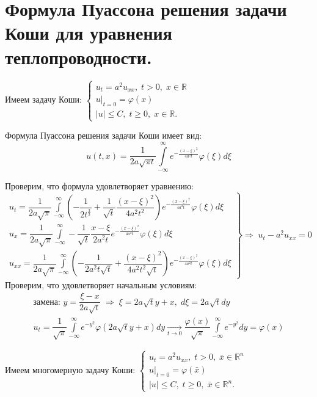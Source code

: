 \chapter{Формула Пуассона решения задачи Коши для уравнения теплопроводности.}
\label{cha:12}

$\text{Имеем задачу Коши: }\begin{cases}
	u_{t} = a^2 u_{xx}, \; t > 0, \; x \in \mathbb{R}\\
	u|_{t = 0} = \varphi (x) \\
	|u| \leq C, \; t \geq 0, \; x \in \mathbb{R}.
\end{cases}$

\begin{theorem}\label{lec:12/the:1}
	Формула Пуассона решения задачи Коши имеет вид:
	$$u(t, x) = \dfrac{1}{2a\sqrt{\pi t}}\int\limits_{-\infty}^{\infty}e^{-\frac{(x - \xi)^2}{4a^2 t}}\varphi (\xi) d\xi$$
\end{theorem}
\begin{Proof}
Проверим, что формула удовлетворяет уравнению:
$$\left.
  		\begin{array}{ccc}
    		u_t = \dfrac{1}{2a\sqrt{\pi}} \int\limits_{-\infty}^{\infty}(-\dfrac{1}{2t^{\frac{3}{2}}} + \dfrac{1}{\sqrt{t}}\dfrac{(x - \xi)^2}{4a^2t^2})e^{-\frac{(x - \xi)^2}{4a^2t}}\varphi(\xi)d\xi \\
			u_x = \dfrac{1}{2a\sqrt{\pi}} \int\limits_{-\infty}^{\infty} -\dfrac{1}{\sqrt{t}}\dfrac{x - \xi}{2a^2t}e^{-\frac{(x - \xi)^2}{4a^2t}}\varphi(\xi)d\xi \\
			u_{xx} = \dfrac{1}{2a\sqrt{\pi}}\int\limits_{-\infty}^{\infty} (-\dfrac{1}{2a^2t\sqrt{t}} + \dfrac{(x - \xi)^2}{4a^2t^2\sqrt{t}})e^{-\frac{(x - \xi)^2}{4a^2t}}\varphi(\xi)d\xi
  		\end{array}
	\right\} \Rightarrow \;  u_{t} - a^2 u_{xx} = 0$$
Проверим, что удовлетворяет начальным условиям: 
$$\begin{gathered}
	\text{замена: }y = \dfrac{\xi - x}{2a\sqrt{t}} \; \Rightarrow \; \xi = 2a\sqrt{t}y + x, \; d\xi = 2a\sqrt{t}dy \\
	u_t = \dfrac{1}{\sqrt{\pi}} \int\limits_{-\infty}^{\infty} e^{-y^2}\varphi(2a\sqrt{t}y+x)dy \xrightarrow[t\to 0]{} \dfrac{\varphi(x)}{\sqrt{\pi}}\int\limits_{-\infty}^{\infty} e^{-y^2}dy = \varphi(x)
\end{gathered}$$
\end{Proof}

$\text{Имеем многомерную задачу Коши: }\begin{cases}
	u_{t} = a^2 u_{xx}, \; t > 0, \; \bar{x} \in \mathbb{R}^n\\
	u|_{t = 0} = \varphi (\bar{x}) \\
	|u| \leq C, \; t \geq 0, \; \bar{x} \in \mathbb{R}^n.
\end{cases}$

